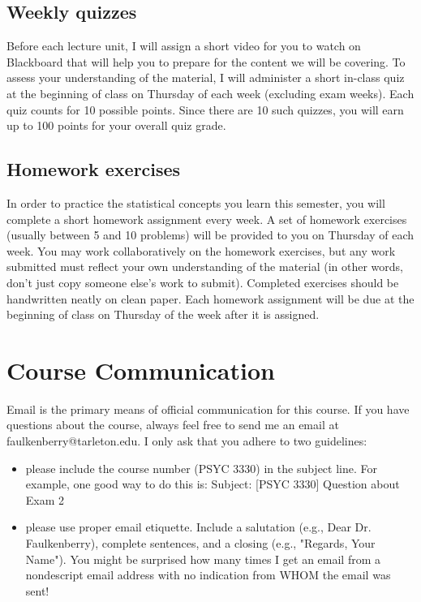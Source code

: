 \documentclass[10pt]{article}
\begin{document}
\subsection*{Weekly quizzes}
\label{sec:org57c91d7}
Before each lecture unit, I will assign a short video for you to watch on Blackboard that will help you to prepare for the content we will be covering. To assess your understanding of the material, I will administer a short in-class quiz at the beginning of class on Thursday of each week (excluding exam weeks). Each quiz counts for 10 possible points.  Since there are 10 such quizzes, you will earn up to 100 points for your overall quiz grade.

\subsection*{Homework exercises}
\label{sec:orgaa5ff35}
In order to practice the statistical concepts you learn this semester, you will complete a short homework assignment every week.  A set of homework exercises (usually between 5 and 10 problems) will be provided to you on Thursday of each week.  You may work collaboratively on the homework exercises, but any work submitted must reflect your own understanding of the material (in other words, don't just copy someone else's work to submit).  Completed exercises should be handwritten neatly on clean paper.  Each homework assignment will be due at the beginning of class on Thursday of the week after it is assigned.

\section*{Course Communication}
\label{sec:orgd15fc73}

Email is the primary means of official communication for this course.  If you have questions about the course, always feel free to send me an email at faulkenberry@tarleton.edu.  I only ask that you adhere to two guidelines:
\begin{itemize}
\item please include the course number (PSYC 3330) in the subject line.  For example, one good way to do this is:  Subject: [PSYC 3330] Question about Exam 2
\item please use proper email etiquette.  Include a salutation (e.g., Dear Dr. Faulkenberry), complete sentences, and a closing (e.g., "Regards, Your Name").  You might be surprised how many times I get an email from a nondescript email address with no indication from WHOM the email was sent!
\end{itemize}
\end{document}

